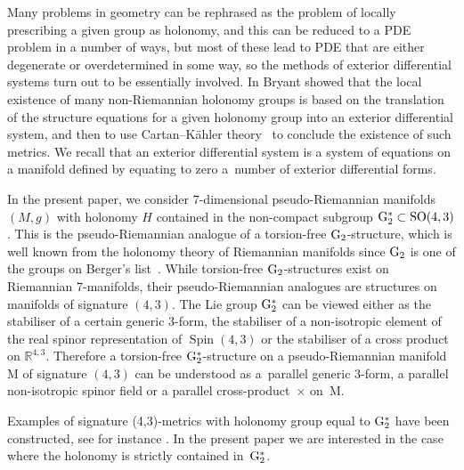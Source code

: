 \documentclass[pdftex]{sigma}
\numberwithin{equation}{section}
\newcommand{\SO}{\mathop{{\rm SO}}}
\newcommand{\Spin}{\operatorname{Spin}}
\newcommand{\G}{\mathop{{{\rm G}_{2}^*}}}
\begin{document}
Many problems in geometry can be rephrased as the problem of locally prescribing a given group as holonomy, and this can be reduced to a PDE problem in a number of ways, but most of these lead to PDE that are either degenerate or overdetermined in some way, so the methods of exterior differential systems turn out to be essentially involved. In \cite{Bryant} Bryant showed that the local existence of many non-Riemannian holonomy groups is based on the translation of the structure equations for a given holonomy group into an exterior differential system, and then to use Cartan--K\"ahler theory~\cite{BCG} to conclude the existence of such metrics. We recall that an exterior differential system is a system of equations on a manifold defined by equating to zero a~number of exterior differential forms.

 In the present paper, we consider $7$-dimensional pseudo-Riemannian manifolds $(M, g)$ with holonomy $H$ contained in the non-compact subgroup $\G \subset \SO(4, 3)$. This is the pseudo-Riemannian analogue of a torsion-free ${\rm G}_2$-structure, which is well known from the holonomy theory of Riemannian manifolds since ${\rm G}_2$ is one of the groups on Berger's list~\cite{Berger}. While torsion-free ${\rm G}_2$-structures exist on Riemannian 7-manifolds, their pseudo-Riemannian analogues are structures on manifolds of signature $(4,3)$. The Lie group $\G$ can be viewed either as the stabiliser of a certain generic 3-form, the stabiliser of a non-isotropic element of the real spinor representation of $\Spin(4, 3)$ or the stabiliser of a cross product on ${\mathbb R}^{4,3}$. Therefore a torsion-free $\G$-structure on a pseudo-Riemannian manifold M of signature $(4, 3)$ can be understood as a~parallel generic $3$-form, a parallel non-isotropic spinor field or a parallel cross-product~$\times$ on~M.

Examples of signature (4,3)-metrics with holonomy group equal to $\G$ have been constructed, see for instance \cite{ALN, CLSS, FL, GW, LP, W2}. In the present paper we are interested in the case where the holonomy is strictly contained in~$\G$.
\end{document}
